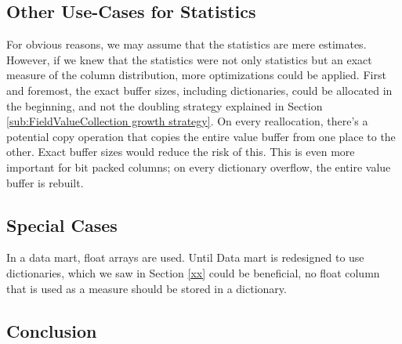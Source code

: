 \subsection{Other Use-Cases for Statistics}
\label{sub:Other Use-Cases for Statistics}
For obvious reasons, we may assume that the statistics are mere estimates. However, if we knew that the statistics were not only statistics but an exact measure of the column distribution, more optimizations could be applied. First and foremost, the exact buffer sizes, including dictionaries, could be allocated in the beginning, and not the doubling strategy explained in Section \ref{sub:FieldValueCollection growth strategy}. On every reallocation, there's a potential copy operation that copies the entire value buffer from one place to the other. Exact buffer sizes would reduce the risk of this. This is even more important for bit packed columns; on every dictionary overflow, the entire value buffer is rebuilt. 

\subsection{Special Cases}
\label{sub:Special Cases}
In a data mart, float arrays are used. Until Data mart is redesigned to use dictionaries, which we saw in Section \ref{xx} could be beneficial, no float column that is used as a measure should be stored in a dictionary. 

\subsection{Conclusion}
\label{sub:Conclusion}


